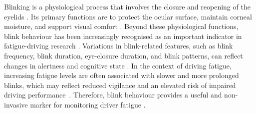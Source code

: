 Blinking is a physiological process that involves the closure and reopening of the eyelids \citep{nystrm2024what}. Its primary functions are to protect the ocular surface, maintain corneal moisture, and support visual comfort \citep{nystrm2024what}. Beyond these physiological functions, blink behaviour has been increasingly recognised as an important indicator in fatigue-driving research \citep{alyan2023blink,tian2021fatigue}. Variations in blink-related features, such as blink frequency, blink duration, eye-closure duration, and blink patterns, can reflect changes in alertness and cognitive state \citep{alyan2023blink,ren2019comparison}.
In the context of driving fatigue, increasing fatigue levels are often associated with slower and more prolonged blinks, which may reflect reduced vigilance and an elevated risk of impaired driving performance~\citep{alyan2023blink}.
Therefore, blink behaviour provides a useful and non-invasive marker for monitoring driver fatigue \citep{shahbakhti2023fusion,tian2021fatigue}.
